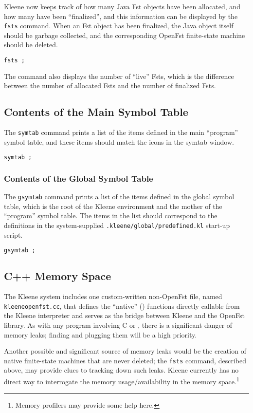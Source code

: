 Kleene now keeps track of how many Java Fst objects have been allocated,
and how many have been ``finalized'', and this information can be
displayed by the \texttt{fsts} command.  When an Fst object has been
finalized, the Java object itself should be garbage collected, and the
corresponding OpenFst finite-state machine should be deleted.

\begin{Verbatim}
fsts ;
\end{Verbatim}

\noindent
The command also displays the number of ``live'' Fsts, which is the
difference between the number of allocated Fsts and the number of finalized Fsts.

\subsection{Contents of the Main Symbol Table}

The \texttt{symtab} command prints a list of the items defined in the main
``program'' symbol table, and these items should match the icons in the  symtab
window.

\begin{Verbatim}
symtab ;
\end{Verbatim}

\subsubsection{Contents of the Global Symbol Table}

The \texttt{gsymtab} command prints a list of the items defined in the global symbol
table, which is the root of the Kleene environment and the mother of the
``program'' symbol table.  The items in the list should correspond to the definitions
in the system-supplied \texttt{.kleene/global/predefined.kl} start-up script.

\begin{Verbatim}
gsymtab ;
\end{Verbatim}

\subsection{C++ Memory Space}

The Kleene system includes one custom-written non-OpenFst \CPP{} file,
named \texttt{kleeneopenfst.cc}, that defines the ``native'' (\CPP{})
functions directly callable from the Kleene interpreter and serves as the
 bridge between Kleene and the OpenFst library.  As with any
program involving C or \CPP{}, there is a significant danger of memory
leaks; finding and plugging them will be a high priority.

Another possible and significant source of \CPP{} memory leaks would be
the creation of native finite-state machines that are never deleted; the
\texttt{fsts} command, described above, may provide clues to tracking
down such leaks.  Kleene currently has no direct way to interrogate the
memory usage/availability in the \CPP{} memory space.\footnote{Memory
profilers may provide some help here.}


